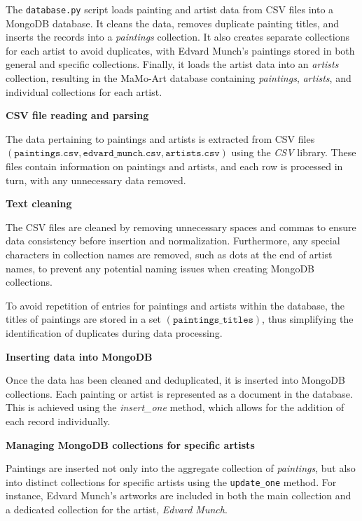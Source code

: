 \documentclass[a4paper,12pt]{article}
\begin{document}
The \texttt{database.py} script loads painting and artist data from CSV files into a MongoDB database. It cleans the data, removes duplicate painting titles, and inserts the records into a \textit{paintings} collection. It also creates separate collections for each artist to avoid duplicates, with Edvard Munch's paintings stored in both general and specific collections. Finally, it loads the artist data into an \textit{artists} collection, resulting in the MaMo-Art database containing \textit{paintings}, \textit{artists}, and individual collections for each artist.

\textbf{CSV file reading and parsing}

The data pertaining to paintings and artists is extracted from CSV files $\left(\texttt{paintings.csv}, \texttt{edvard\_munch.csv}, \texttt{artists.csv}\right)$ using the \textit{CSV} library. These files contain information on paintings and artists, and each row is processed in turn, with any unnecessary data removed.

\textbf{Text cleaning}

The CSV files are cleaned by removing unnecessary spaces and commas to ensure data consistency before insertion and normalization. Furthermore, any special characters in collection names are removed, such as dots at the end of artist names, to prevent any potential naming issues when creating MongoDB collections.

To avoid repetition of entries for paintings and artists within the database, the titles of paintings are stored in a set $\left(\texttt{paintings\_titles}\right)$, thus simplifying the identification of duplicates during data processing.

\textbf{Inserting data into MongoDB}

Once the data has been cleaned and deduplicated, it is inserted into MongoDB collections. Each painting or artist is represented as a document in the database. This is achieved using the \textit{insert\_one} method, which allows for the addition of each record individually.

\textbf{Managing MongoDB collections for specific artists}

Paintings are inserted not only into the aggregate collection of \textit{paintings}, but also into distinct collections for specific artists using the \texttt{update\_one} method. For instance, Edvard Munch's artworks are included in both the main collection and a dedicated collection for the artist, \textit{Edvard Munch}.
\end{document}
